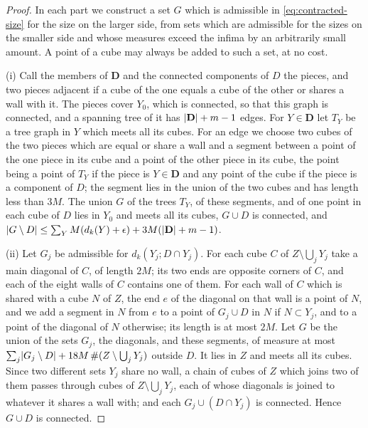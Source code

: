 \documentclass[11pt]{preprint}
\DeclarePairedDelimiter{\abs}{\lvert}{\rvert}
\numberwithin{equation}{section}
\theoremstyle{definition}
\theoremstyle{remark}
\theoremstyle{plain}
\begin{document}
\begin{proof}
In each part we construct a set $G$ which is admissible in \eqref{eq:contracted-size} for the size on the larger side, from sets which are admissible for the sizes on the smaller side and whose measures exceed the infima by an arbitrarily small amount. A point of a cube may always be added to such a set, at no cost.

(i) Call the members of $\mathbf D$ and the connected components of $D$ the pieces, and two pieces adjacent if a cube of the one equals a cube of the other or shares a wall with it. The pieces cover $Y_0$, which is connected, so that this graph is connected, and a spanning tree of it has $\abs{\mathbf D} + m - 1$ edges. For $Y \in \mathbf D$ let $T_Y$ be a tree graph in $Y$ which meets all its cubes. For an edge we choose two cubes of the two pieces which are equal or share a wall and a segment between a point of the one piece in its cube and a point of the other piece in its cube, the point being a point of $T_Y$ if the piece is $Y \in \mathbf D$ and any point of the cube if the piece is a component of $D$; the segment lies in the union of the two cubes and has length less than $3M$. The union $G$ of the trees $T_Y$, of these segments, and of one point in each cube of $D$ lies in $Y_0$ and meets all its cubes, $G \cup D$ is connected, and $\abs{G \setminus D} \leq \sum_YM(d_k(Y) + \epsilon) + 3M(\abs{\mathbf D} + m - 1)$.

(ii) Let $G_j$ be admissible for $d_k(Y_j; D \cap Y_j)$. For each cube $C$ of $Z \setminus \bigcup_jY_j$ take a main diagonal of $C$, of length $2M$; its two ends are opposite corners of $C$, and each of the eight walls of $C$ contains one of them. For each wall of $C$ which is shared with a cube $N$ of $Z$, the end $e$ of the diagonal on that wall is a point of $N$, and we add a segment in $N$ from $e$ to a point of $G_j \cup D$ in $N$ if $N \subset Y_j$, and to a point of the diagonal of $N$ otherwise; its length is at most $2M$. Let $G$ be the union of the sets $G_j$, the diagonals, and these segments, of measure at most $\sum_j\abs{G_j \setminus D} + 18M\,\#(Z \setminus \bigcup_jY_j)$ outside $D$. It lies in $Z$ and meets all its cubes. Since two different sets $Y_j$ share no wall, a chain of cubes of $Z$ which joins two of them passes through cubes of $Z \setminus \bigcup_jY_j$, each of whose diagonals is joined to whatever it shares a wall with; and each $G_j \cup (D \cap Y_j)$ is connected. Hence $G \cup D$ is connected.


\end{proof}
\end{document}
